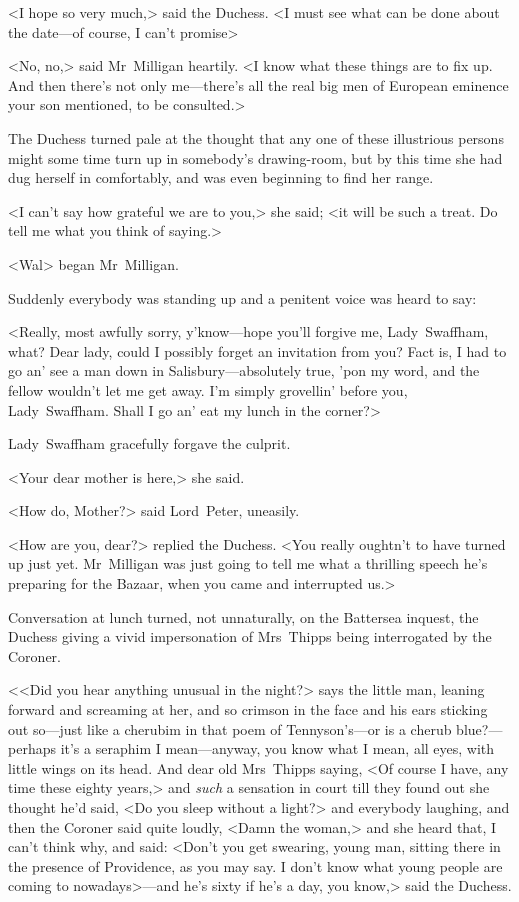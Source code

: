 <I hope so very much,> said the Duchess. <I must see what can be done about the date—of course, I can't promise\longdash>

<No, no,> said Mr~Milligan heartily. <I know what these things are to fix up. And then there's not only me—there's all the real big men of European eminence your son mentioned, to be consulted.>

The Duchess turned pale at the thought that any one of these illustrious persons might some time turn up in somebody's drawing-room, but by this time she had dug herself in comfortably, and was even beginning to find her range.

<I can't say how grateful we are to you,> she said; <it will be such a treat. Do tell me what you think of saying.>

<Wal\longdash> began Mr~Milligan.

Suddenly everybody was standing up and a penitent voice was heard to say:

<Really, most awfully sorry, y'know—hope you'll forgive me, Lady~Swaffham, what? Dear lady, could I possibly forget an invitation from you? Fact is, I had to go an' see a man down in Salisbury—absolutely true, 'pon my word, and the fellow wouldn't let me get away. I'm simply grovellin' before you, Lady~Swaffham. Shall I go an' eat my lunch in the corner?>

Lady~Swaffham gracefully forgave the culprit.

<Your dear mother is here,> she said.

<How do, Mother?> said Lord~Peter, uneasily.

<How are you, dear?> replied the Duchess. <You really oughtn't to have turned up just yet. Mr~Milligan was just going to tell me what a thrilling speech he's preparing for the Bazaar, when you came and interrupted us.>

Conversation at lunch turned, not unnaturally, on the Battersea inquest, the Duchess giving a vivid impersonation of Mrs~Thipps being interrogated by the Coroner.

<<Did you hear anything unusual in the night?> says the little man, leaning forward and screaming at her, and so crimson in the face and his ears sticking out so—just like a cherubim in that poem of Tennyson's—or is a cherub blue?—perhaps it's a seraphim I mean—anyway, you know what I mean, all eyes, with little wings on its head. And dear old Mrs~Thipps saying, <Of course I have, any time these eighty years,> and \textit{such} a sensation in court till they found out she thought he'd said, <Do you sleep without a light?> and everybody laughing, and then the Coroner said quite loudly, <Damn the woman,> and she heard that, I can't think why, and said: <Don't you get swearing, young man, sitting there in the presence of Providence, as you may say. I don't know what young people are coming to nowadays>—and he's sixty if he's a day, you know,> said the Duchess.

